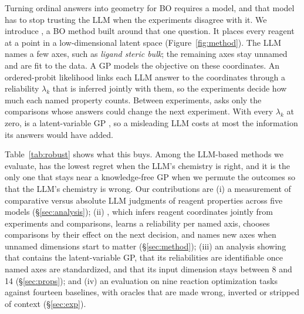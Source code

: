 Turning ordinal answers into geometry for BO requires a model, and that model has to stop trusting the LLM when the experiments disagree with it. We introduce \ours{}, a BO method built around that one question. It places every reagent at a point in a low-dimensional latent space (Figure~\ref{fig:method}). The LLM names a few axes, such as \emph{ligand steric bulk}; the remaining axes stay unnamed and are fit to the data. A GP models the objective on these coordinates. An ordered-probit likelihood links each LLM answer to the coordinates through a reliability $\lambda_k$ that is inferred jointly with them, so the experiments decide how much each named property counts. Between experiments, \ours{} asks only the comparisons whose answers could change the next experiment. With every $\lambda_k$ at zero, \ours{} is a latent-variable GP \citep{zhang2020latent}, so a misleading LLM costs at most the information its answers would have added.

Table~\ref{tab:robust} shows what this buys. Among the LLM-based methods we evaluate, \ours{} has the lowest regret when the LLM's chemistry is right, and it is the only one that stays near a knowledge-free GP when we permute the outcomes so that the LLM's chemistry is wrong. Our contributions are (i) a measurement of comparative versus absolute LLM judgments of reagent properties across five models (\S\ref{sec:analysis}); (ii) \ours{}, which infers reagent coordinates jointly from experiments and comparisons, learns a reliability per named axis, chooses comparisons by their effect on the next decision, and names new axes when unnamed dimensions start to matter (\S\ref{sec:method}); (iii) an analysis showing that \ours{} contains the latent-variable GP, that its reliabilities are identifiable once named axes are standardized, and that its input dimension stays between 8 and 14 (\S\ref{sec:props}); and (iv) an evaluation on nine reaction optimization tasks against fourteen baselines, with oracles that are made wrong, inverted or stripped of context (\S\ref{sec:exp}).

